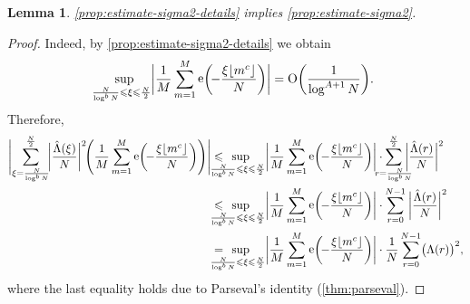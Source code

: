 \documentclass[letterpaper, 12pt]{article}
\theoremstyle{plain}
\newtheorem{Lemma}[Theorem]{Lemma}
\theoremstyle{definition}
\theoremstyle{plain}
\theoremstyle{plain}
\numberwithin{equation}{section}
\newcommand{\Oh}{{\rm O}}
\renewcommand{\leq}{\leqslant}
\newcommand{\1}{\textbf{1}}
\DeclarePairedDelimiter\floor{\lfloor}{\rfloor}
\DeclareMathOperator{\e}{e}
\begin{document}
\begin{Lemma}\label{lem:sigma2-proof-works}
    \cref{prop:estimate-sigma2-details} implies \cref{prop:estimate-sigma2}.
\end{Lemma}
\begin{proof}
    Indeed, by \cref{prop:estimate-sigma2-details} we obtain
    \begin{equation*}
        \sup_{\mkern-10mu \frac{N}{\log^b N} \leq \xi \leq \frac{N}{2}}
            \biggl\lvert \frac{1}{M} \sum_{m=1}^M \e\biggl(\! -\frac{\xi \floor{m^c}}{N} \biggr)\biggr\rvert 
            = \Oh\biggl(\frac{1}{\log^{A+1} N}\biggr).
    \end{equation*}
    Therefore,
    \begin{align*}
        \Biggl\lvert \sum_{\xi = \frac{N}{\log^b N}}^{\frac{N}{2}} \!\biggl\lvert \frac{\hat{\Lambda}(\xi)}{N} \biggr\rvert^2 \! \Biggl(\frac{1}{M} \sum_{m = 1}^M \e\biggl(\! -\frac{\xi \floor{m^c}}{N} \biggr)\Biggr)\Biggr\rvert
        &\leq \;\,\smashoperator[l]{\sup_{\mkern-11mu \frac{N}{\log^b N} \leq \xi \leq \frac{N}{2}}} \biggl\lvert \frac{1}{M} \sum_{m = 1}^{M} \e\biggl(\! -\frac{\xi \floor{m^c}}{N} \biggr)\biggr\rvert 
        \cdot \sum_{\mathclap{r = \frac{N}{\log^b N}}}^{\frac{N}{2}}\: \biggl\lvert \frac{\hat{\Lambda}(r)}{N} \biggr\rvert^2\\
        &\leq \;\,\smashoperator[l]{\sup_{\mkern-11mu \frac{N}{\log^b N} \leq \xi \leq \frac{N}{2}}} \biggl\lvert \frac{1}{M} \sum_{m = 1}^{M} \e\biggl(\! -\frac{\xi \floor{m^c}}{N} \biggr)\biggr\rvert 
        \cdot \sum_{r = 0}^{N - 1}\: \biggl\lvert \frac{\hat{\Lambda}(r)}{N} \biggr\rvert^2\\
        &= \;\,\smashoperator[l]{\sup_{\mkern-11mu \frac{N}{\log^b N} \leq \xi \leq \frac{N}{2}}} \biggl\lvert \frac{1}{M} \sum_{m = 1}^{M} \e\biggl(\! -\frac{\xi \floor{m^c}}{N} \biggr)\biggr\rvert 
        \cdot\frac{1}{N} \sum_{r = 0}^{N - 1} \bigl(\Lambda(r) \bigr)^2,
    \end{align*}
    where the last equality holds due to Parseval's identity (\cref{thm:parseval}).
    

\end{proof}
\end{document}
